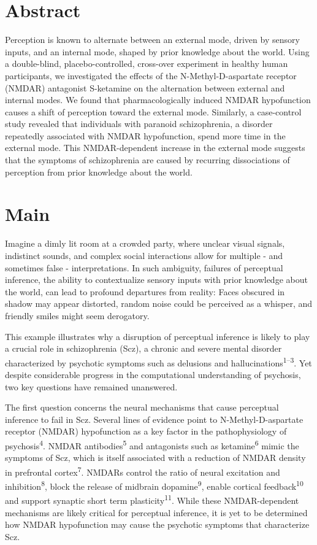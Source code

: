 \documentclass[
]{article}
\begin{document}
\hypertarget{abstract}{%
\section{Abstract}\label{abstract}}

Perception is known to alternate between an external mode, driven by sensory inputs, and an internal mode, shaped by prior knowledge about the world. Using a double-blind, placebo-controlled, cross-over experiment in healthy human participants, we investigated the effects of the N-Methyl-D-aspartate receptor (NMDAR) antagonist S-ketamine on the alternation between external and internal modes. We found that pharmacologically induced NMDAR hypofunction causes a shift of perception toward the external mode. Similarly, a case-control study revealed that individuals with paranoid schizophrenia, a disorder repeatedly associated with NMDAR hypofunction, spend more time in the external mode. This NMDAR-dependent increase in the external mode suggests that the symptoms of schizophrenia are caused by recurring dissociations of perception from prior knowledge about the world.

\hypertarget{main}{%
\section{Main}\label{main}}

Imagine a dimly lit room at a crowded party, where unclear visual
signals, indistinct sounds, and complex social interactions allow for
multiple - and sometimes false - interpretations. In such ambiguity,
failures of perceptual inference, the ability to contextualize sensory
inputs with prior knowledge about the world, can lead to profound
departures from reality: Faces obscured in shadow may appear distorted,
random noise could be perceived as a whisper, and friendly smiles might
seem derogatory.

This example illustrates why a disruption of perceptual inference is
likely to play a crucial role in schizophrenia (Scz), a chronic and
severe mental disorder characterized by psychotic symptoms such as
delusions and hallucinations\textsuperscript{1--3}. Yet despite
considerable progress in the computational understanding of psychosis,
two key questions have remained unanswered.

The first question concerns the neural mechanisms that cause perceptual
inference to fail in Scz. Several lines of evidence point to
N-Methyl-D-aspartate receptor (NMDAR) hypofunction as a key factor in
the pathophysiology of psychosis\textsuperscript{4}. NMDAR
antibodies\textsuperscript{5} and antagonists such as
ketamine\textsuperscript{6} mimic the symptoms of Scz, which is itself
associated with a reduction of NMDAR density in prefrontal
cortex\textsuperscript{7}. NMDARs control the ratio of neural excitation
and inhibition\textsuperscript{8}, block the release of midbrain
dopamine\textsuperscript{9}, enable cortical
feedback\textsuperscript{10} and support synaptic short term
plasticity\textsuperscript{11}. While these NMDAR-dependent mechanisms
are likely critical for perceptual inference, it is yet to be determined
how NMDAR hypofunction may cause the psychotic symptoms that
characterize Scz.
\end{document}
